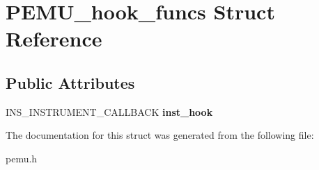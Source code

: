 \hypertarget{structPEMU__hook__funcs}{\section{\-P\-E\-M\-U\-\_\-hook\-\_\-funcs \-Struct \-Reference}
\label{structPEMU__hook__funcs}
}
\subsection*{\-Public \-Attributes}
\begin{DoxyCompactItemize}
\item 
\hypertarget{structPEMU__hook__funcs_a5325eb42432ef2626ba28a8a4982f260}{\-I\-N\-S\-\_\-\-I\-N\-S\-T\-R\-U\-M\-E\-N\-T\-\_\-\-C\-A\-L\-L\-B\-A\-C\-K {\bfseries inst\-\_\-hook}}\label{structPEMU__hook__funcs_a5325eb42432ef2626ba28a8a4982f260}

\end{DoxyCompactItemize}


\-The documentation for this struct was generated from the following file\-:\begin{DoxyCompactItemize}
\item 
pemu.\-h\end{DoxyCompactItemize}
